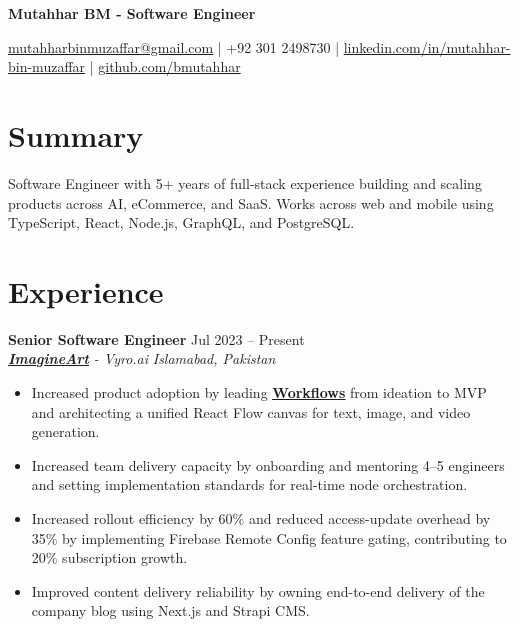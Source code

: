 \documentclass[9pt,letterpaper]{article}
\newcommand{\resumeHeader}[1]{%
  \begin{center}
    \vspace{2pt}
    {\fontsize{18pt}{20pt}\selectfont\bfseries #1\par}
    \vspace{4pt}
  \end{center}
}
\newcommand{\role}[4]{\textbf{#1} \hfill #2 \\
\textit{#3} \hfill \textit{#4}\\[-4pt]}
\begin{document}
\resumeHeader{Mutahhar BM - Software Engineer}
\begin{center}
\fontsize{9pt}{11pt}\selectfont
\href{mailto:mutahharbinmuzaffar@gmail.com}{mutahharbinmuzaffar@gmail.com} \;|\; +92 301 2498730 \;|\;
\href{https://www.linkedin.com/in/mutahhar-bin-muzaffar}{linkedin.com/in/mutahhar-bin-muzaffar} \;|\;
\href{https://github.com/bmutahhar}{github.com/bmutahhar}
\end{center}

\section*{Summary}
Software Engineer with 5+ years of full-stack experience building and scaling products across AI, eCommerce, and SaaS. Works across web and mobile using TypeScript, React, Node.js, GraphQL, and PostgreSQL.

\section*{Experience}
\role{Senior Software Engineer}{Jul 2023 -- Present}{\href{https://www.imagine.art/}{\textbf{\underline{ImagineArt}}} - Vyro.ai}{Islamabad, Pakistan}
\begin{itemize}[leftmargin=*, itemsep=0pt, topsep=0pt, partopsep=0pt, parsep=0pt, after=\vspace{2pt}]
  \item Increased product adoption by leading \href{https://www.imagine.art/flow}{\textbf{\underline{Workflows}}} from ideation to MVP and architecting a unified React Flow canvas for text, image, and video generation.
  \item Increased team delivery capacity by onboarding and mentoring 4--5 engineers and setting implementation standards for real-time node orchestration.
  \item Increased rollout efficiency by 60\% and reduced access-update overhead by 35\% by implementing Firebase Remote Config feature gating, contributing to 20\% subscription growth.
  \item Improved content delivery reliability by owning end-to-end delivery of the company blog using Next.js and Strapi CMS.

\end{itemize}
\end{document}
